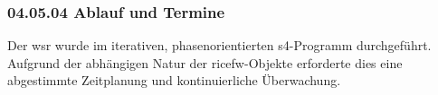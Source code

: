 \subsubsection*{04.05.04 Ablauf und Termine} 
\label{04.05.04	AblaufUndTermine}

\par Der \gls{wsr} wurde im iterativen, phasenorientierten \gls{s4}-Programm durchgeführt. Aufgrund der abhängigen Natur der \gls{ricefw}-Objekte erforderte dies eine abgestimmte Zeitplanung und kontinuierliche Überwachung.
